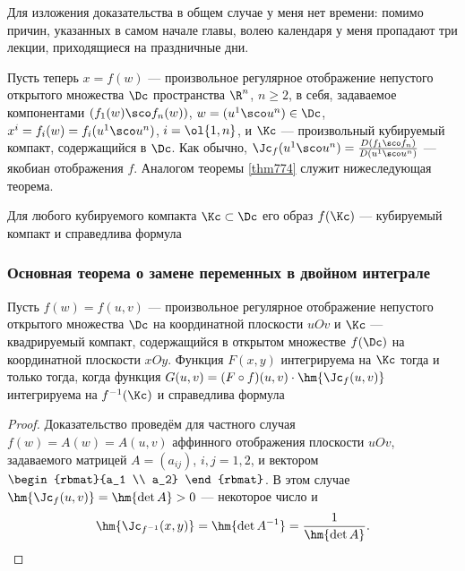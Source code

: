 \documentclass[a4paper]{article}
\begin{document}
Для изложения доказательства в общем случае у меня нет времени:
помимо причин, указанных в самом начале главы, волею календаря у
меня пропадают три лекции, приходящиеся на праздничные дни.

Пусть теперь $x=f(w)$ --- произвольное регулярное отображение
непустого открытого множества $\Dc$ пространства $\R^n$, $n\ge2$,
 в себя, задаваемое компонентами $(f_1(w)\sco f_n(w))$, $w=
(u^1\sco u^n)\in \Dc$, $x^i=f_i(w)=f_i(u^1\sco u^n)$, $i=\ol{1,n}$,
и $\Kc$ --- произвольный кубируемый компакт, содержащийся в $\Dc$.
Как обычно, $\Jc_f(u^1\sco u^n)=\frac{D(f_1\sco f_n)}{D(u^1\sco
u^n)}$
--- якобиан отображения $f$. Аналогом теоремы \ref{thm774} служит
нижеследующая теорема.

\begin{theorem}
Для любого кубируемого компакта $\Kc\subset\Dc$ его образ $f(\Kc)$
--- кубируемый компакт и справедлива формула
\end{theorem}

\subsubsection{Основная теорема о замене переменных в двойном
интеграле}

\begin{theorem}
Пусть $f(w)=f(u,v)$ --- произвольное регулярное отображение
непустого открытого множества $\Dc$ на координатной плоскости $uOv$
и $\Kc$ --- квадрируемый компакт, содержащийся в открытом множестве
$f(\Dc)$ на координатной плоскости $xOy$. Функция $F(x,y)$
интегрируема на $\Kc$ тогда и только тогда, когда функция $G(u,v) =
(F\circ f)(u,v)\cdot \hm{\Jc_f(u,v)}$ интегрируема на $f^{-1}(\Kc)$
и справедлива формула 
\end{theorem}

\begin{proof}
Доказательство проведём для частного случая $f(w)=A(w)=A(u,v)$
аффинного отображения плоскости $uOv$, задаваемого матрицей
$A=(a_{ij})$, $i,j=1,2$, и вектором $\begin{rbmat}{a_1 \\ a_2}
\end{rbmat}$. В этом случае $\hm{\Jc_f(u,v)} = \hm{\det A}>0$ ---
некоторое число и $$\hm{\Jc_{f^{-1}}(x,y)} = \hm{\det A^{-1}} =
\frac1{\hm{\det A}}.$$
\end{proof}
\end{document}
